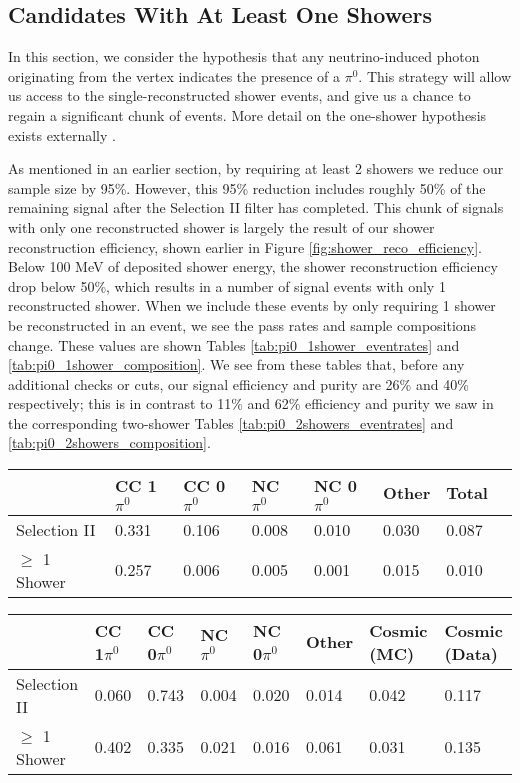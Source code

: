 \subsection{Candidates With At Least One Showers}
In this section, we consider the hypothesis that any neutrino-induced photon originating from the vertex indicates the presence of a $\pi^0$.  This strategy will allow us access to the single-reconstructed shower events, and give us a chance to regain a significant chunk of events. More detail on the one-shower hypothesis exists externally \cite{bib:timb_singleshower}.
\par As mentioned in an earlier section, by requiring at least 2 showers we reduce our sample size by 95\%.  However, this 95\% reduction includes roughly 50\% of the remaining signal after the Selection II filter has completed. This chunk of signals with only one reconstructed shower is largely the result of our shower reconstruction efficiency, shown earlier in Figure \ref{fig:shower_reco_efficiency}. Below 100 MeV of deposited shower energy, the shower reconstruction efficiency drop below 50\%, which results in a number of signal events with only 1 reconstructed shower. When we include these events by only requiring 1 shower be reconstructed in an event, we see the pass rates and sample compositions change.  These values are shown Tables \ref{tab:pi0_1shower_eventrates} and \ref{tab:pi0_1shower_composition}. We see from these tables that, before any additional checks or cuts, our signal efficiency and purity are 26\% and 40\% respectively; this is in contrast to 11\% and 62\% efficiency and purity we saw in the corresponding two-shower Tables \ref{tab:pi0_2showers_eventrates} and \ref{tab:pi0_2showers_composition}. 

\begin{table}[H]
\centering
{}
 \begin{tabular}{| l | l | l |l|l|l|l|l|}
 \hline
 & CC 1$\pi^0$ & CC 0$\pi^0$ & NC $\pi^0$ & NC 0$\pi^0$ & Other & Total \\ [0.1ex] \hline
Selection II & 0.331 & 0.106 & 0.008 & 0.010 & 0.030 & 0.087 \\
$\geq$ 1 Shower & 0.257 & 0.006 & 0.005 & 0.001 & 0.015 & 0.010 \\ \hline
\end{tabular}
\end{table}

\begin{table}[H]
\centering
{}
 \begin{tabular}{| l | l | l |l|l|l|l|l|}
 \hline
 & CC 1$\pi^0$ & CC 0$\pi^0$ & NC $\pi^0$ & NC 0$\pi^0$ & Other & Cosmic (MC) & Cosmic (Data) \\ [0.1ex] \hline
Selection II & 0.060 & 0.743 & 0.004 & 0.020 & 0.014 & 0.042 & 0.117 \\
$\geq$ 1 Shower & 0.402 & 0.335 & 0.021 & 0.016 & 0.061 & 0.031 & 0.135\\ \hline
\end{tabular}
\end{table}

